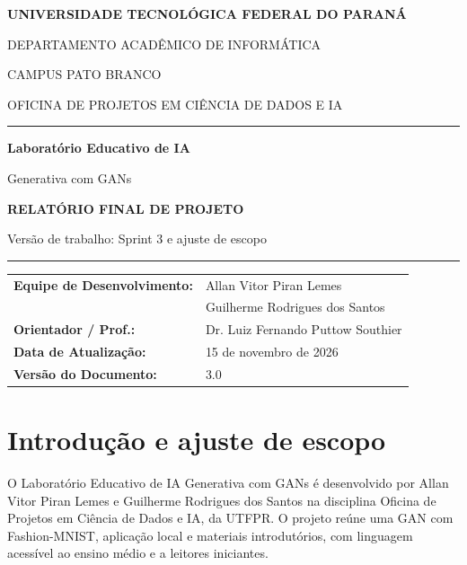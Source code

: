 \documentclass[12pt,a4paper]{article}
\renewcommand{\arraystretch}{1.2}
\begin{document}
\renewcommand{\contentsname}{Sumário}
\renewcommand{\refname}{Referências}

\begin{titlepage}
\thispagestyle{fancy}
\centering
\vspace*{0.7cm}
{\Large\bfseries UNIVERSIDADE TECNOLÓGICA FEDERAL DO PARANÁ\par}
\vspace{0.15cm}
{\large DEPARTAMENTO ACADÊMICO DE INFORMÁTICA\par}
\vspace{0.1cm}
{\small CAMPUS PATO BRANCO\par}
\vspace{0.1cm}
{\small OFICINA DE PROJETOS EM CIÊNCIA DE DADOS E IA\par}
\vspace{1.6cm}
\noindent\rule{\textwidth}{1pt}\par
\vspace{0.2cm}
{\Huge\bfseries\color{azulProfessor}Laboratório Educativo de IA\par Generativa com GANs\par}
\vspace{0.35cm}
{\large\bfseries RELATÓRIO FINAL DE PROJETO\par}
\vspace{0.25cm}
{\small Versão de trabalho: Sprint 3 e ajuste de escopo\par}
\vspace{0.45cm}
\noindent\rule{\textwidth}{1pt}\par
\vspace{1.2cm}
{\renewcommand{\arraystretch}{1.05}
\begin{tabular}{@{}ll@{}}
\textbf{Equipe de Desenvolvimento:} & Allan Vitor Piran Lemes \\
 & Guilherme Rodrigues dos Santos \\
\textbf{Orientador / Prof.:} & Dr. Luiz Fernando Puttow Southier \\
\textbf{Data de Atualização:} & 15 de novembro de 2026 \\
\textbf{Versão do Documento:} & 3.0 \\
\end{tabular}\par}
\end{titlepage}
\setcounter{page}{2}
\tableofcontents
\clearpage

\section{Introdução e ajuste de escopo}
O Laboratório Educativo de IA Generativa com GANs é desenvolvido por Allan Vitor Piran Lemes e Guilherme Rodrigues dos Santos na disciplina Oficina de Projetos em Ciência de Dados e IA, da UTFPR. O projeto reúne uma GAN com Fashion-MNIST, aplicação local e materiais introdutórios, com linguagem acessível ao ensino médio e a leitores iniciantes.
\end{document}
